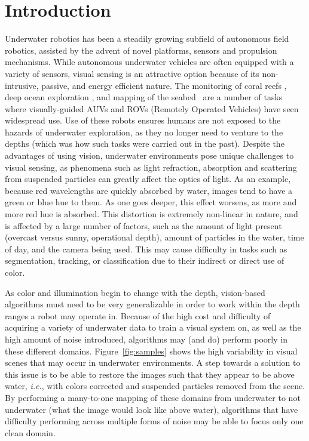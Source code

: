 \documentclass[letterpaper, 10pt, conference]{ieeeconf}
\newcommand{\marginlabel}[1]{\mbox{}\marginpar[\raggedleft\hspace{0pt}{#1}]{
\raggedright\hspace{0pt}{#1}}}
\newcommand{\starnote}[1]{\marginlabel{$\bigstar$}\textbf{[#1]}}
\begin{document}
\section{Introduction}
Underwater robotics has been a steadily growing subfield of autonomous field robotics, assisted by the advent of novel platforms,
sensors and propulsion mechanisms. While autonomous underwater vehicles are often equipped with a variety of sensors, visual sensing is an
attractive option because of its non-intrusive, passive, and energy efficient nature. The monitoring of coral reefs \cite{shkurti2012multi},
deep ocean exploration \cite{whitcomb2000advances}, and mapping of the seabed~\cite{bingham2010robotic} are a number of tasks where
visually-guided AUVs and ROVs (Remotely Operated Vehicles) have seen widespread use. Use of these robots ensures humans are not exposed to
the hazards of underwater exploration, as they no longer need to venture to the depths (which was how such tasks were carried out in the
past). Despite the advantages of using vision, underwater environments pose unique challenges to visual sensing, as phenomena such as light
refraction, absorption and scattering from suspended particles can greatly affect the optics of light. As an example, because red
wavelengths are quickly absorbed by water, images tend to have a green or blue hue to them. As one goes deeper, this effect worsens, as more
and more red hue is absorbed. This distortion is extremely non-linear in nature, and is affected by a large number of factors, such as the
amount of light present (overcast versus sunny, operational depth), amount of particles in the water, time of day, and the camera being
used. This may cause difficulty in tasks such as segmentation, tracking, or classification due to their indirect or direct use of color.

As color and illumination begin to change with the depth, vision-based algorithms must need to be very generalizable in order to work within
the depth ranges a robot may operate in. Because of the high cost and difficulty of acquiring a variety of underwater data to train a visual
system on, as well as the high amount of noise introduced, algorithms may (and do) perform poorly in these different
domains. Figure~\ref{fig:samples} shows the high variability in visual scenes that may occur in
underwater environments. A step towards a solution to this issue is to be able to restore the images such that they appear to be above
water, \emph{i.e.}, with colors corrected and suspended particles removed from the scene. By performing a many-to-one mapping of these
domains from underwater to not underwater (what the image would look like above water), algorithms that have difficulty performing across
multiple forms of noise may be able to focus only one clean domain.
\end{document}

